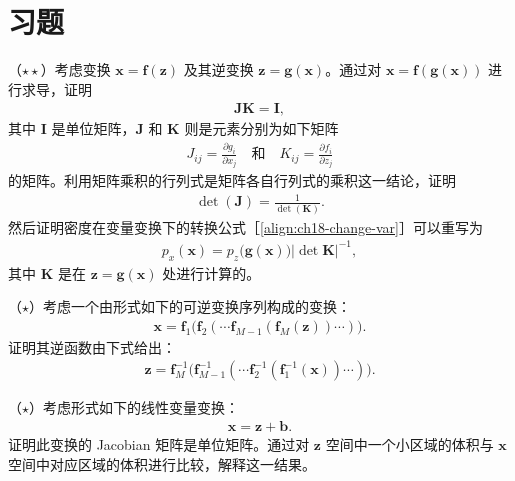 \documentclass[../../main.tex]{subfiles}
\begin{document}
\section{习题}\label{section:ch18-习题}

\begin{exercise}\label{exercise:ch18-01}
（$\star\star$）考虑变换 $\bm{x}=\bm{f}(\bm{z})$ 及其逆变换 $\bm{z}=\bm{g}(\bm{x})$。通过对 $\bm{x}=\bm{f}(\bm{g}(\bm{x}))$ 进行求导，证明
\begin{align}
  \bm{J}\bm{K}=\bm{I},\label{align:ch18-习题01-JK}
\end{align}
其中 $\bm{I}$ 是单位矩阵，$\bm{J}$ 和 $\bm{K}$ 则是元素分别为如下矩阵
\begin{align}
  J_{ij}=\frac{\partial g_i}{\partial x_j}\quad\text{和}\quad K_{ij}=\frac{\partial f_i}{\partial z_j}\label{align:ch18-习题01-JK定义}
\end{align}
的矩阵。利用矩阵乘积的行列式是矩阵各自行列式的乘积这一结论，证明
\begin{align}
  \det(\bm{J})=\frac{1}{\det(\bm{K})}.\label{align:ch18-习题01-行列式}
\end{align}
然后证明密度在变量变换下的转换公式［\eqref{align:ch18-change-var}］可以重写为
\begin{align}
  p_x(\bm{x})=p_z\big(\bm{g}(\bm{x})\big)\left|\det\bm{K}\right|^{-1},\label{align:ch18-习题01-密度}
\end{align}
其中 $\bm{K}$ 是在 $\bm{z}=\bm{g}(\bm{x})$ 处进行计算的。
\end{exercise}

\begin{exercise}\label{exercise:ch18-02}
（$\star$）考虑一个由形式如下的可逆变换序列构成的变换：
\begin{align}
  \bm{x}=\bm{f}_1\big(\bm{f}_2(\cdots\bm{f}_{M-1}(\bm{f}_M(\bm{z}))\cdots)\big).\label{align:ch18-习题02-复合}
\end{align}
证明其逆函数由下式给出：
\begin{align}
  \bm{z}=\bm{f}_M^{-1}\big(\bm{f}_{M-1}^{-1}(\cdots\bm{f}_2^{-1}(\bm{f}_1^{-1}(\bm{x}))\cdots)\big).\label{align:ch18-习题02-逆}
\end{align}
\end{exercise}

\begin{exercise}\label{exercise:ch18-03}
（$\star$）考虑形式如下的线性变量变换：
\begin{align}
  \bm{x}=\bm{z}+\bm{b}.\label{align:ch18-习题03-平移}
\end{align}
证明此变换的 Jacobian 矩阵是单位矩阵。通过对 $\bm{z}$ 空间中一个小区域的体积与 $\bm{x}$ 空间中对应区域的体积进行比较，解释这一结果。
\end{exercise}
\end{document}
